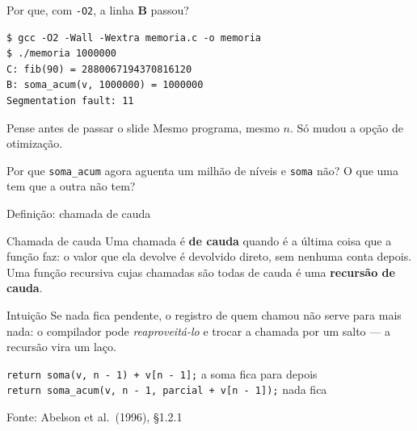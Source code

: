 \documentclass[aspectratio=169]{beamer}
\newcommand{\fonte}[1]{\vfill\hfill{\scriptsize\textcolor{UFSGray}{Fonte: #1}}}
\begin{document}
\begin{frame}[fragile]{Por que, com \texttt{-O2}, a linha \textbf{B} passou?}
\begin{lstlisting}[style=shellStyle]
$ gcc -O2 -Wall -Wextra memoria.c -o memoria
$ ./memoria 1000000
C: fib(90) = 2880067194370816120
B: soma_acum(v, 1000000) = 1000000
Segmentation fault: 11
\end{lstlisting}
  \begin{block}{Pense antes de passar o slide}
    \small Mesmo programa, mesmo $n$. Só mudou a opção de otimização.

    \medskip
    Por que \texttt{soma\_acum} agora aguenta um milhão de níveis e
    \texttt{soma} não? O que uma tem que a outra não tem?
  \end{block}
\end{frame}

\begin{frame}{Definição: chamada de cauda}
  \begin{block}{Chamada de cauda}
    \small Uma chamada é \textbf{de cauda} quando é a última coisa que a
    função faz: o valor que ela devolve é devolvido direto, sem nenhuma
    conta depois. Uma função recursiva cujas chamadas são todas de cauda é
    uma \textbf{recursão de cauda}.
  \end{block}
  \begin{exampleblock}{Intuição}
    \small Se nada fica pendente, o registro de quem chamou não serve para
    mais nada: o compilador pode \emph{reaproveitá-lo} e trocar a chamada
    por um salto --- a recursão vira um laço.
  \end{exampleblock}
  \begin{center}
    \small
    \texttt{return soma(v, n - 1) + v[n - 1];} \quad
    \textcolor{UFSRed}{a soma fica para depois}\\[0.2em]
    \texttt{return soma\_acum(v, n - 1, parcial + v[n - 1]);} \quad
    \textcolor{UFSBlue}{nada fica}
  \end{center}
  \fonte{Abelson et al.\ (1996), §1.2.1~\cite{abelson1996structure}}
\end{frame}
\end{document}
